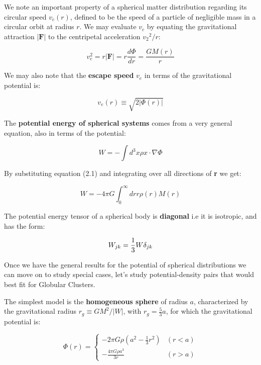 We note an important property of a spherical matter distribution regarding its circular speed $v_{c}(r)$, defined to be the speed of a particle of negligible mass in a circular orbit at radius $r$. We may evaluate $v_{c}$ by equating the gravitational attraction $|\textbf{F}|$  to the centripetal acceleration ${v_{2}}^{2}/r$:

\begin{equation}
v_{c}^{2}=r|\textbf{F}|=r\frac{d\Phi}{dr}=\frac{GM(r)}{r}
\end{equation}

We may also note that the \textbf{escape speed} $v_{e}$ in terms of the gravitational potential is:

\begin{equation}
v_{e}(r)\equiv\sqrt{2|\Phi(r)|}
\end{equation}

The \textbf{potential energy of spherical systems}  comes from a very general equation, also in terms of the potential:

\begin{equation}
W=-\int d^{3}x\rho x\cdot\nabla\Phi
\end{equation}

By substituting equation (2.1) and integrating over all directions of \textbf{r} we get:

\begin{equation}
W=-4\pi G\int_{0}^{\infty}drr\rho(r)M(r)
\end{equation}

The potential energy tensor of a spherical body is \textbf{diagonal} i.e it is isotropic, and has the form:

\begin{equation}
W_{jk}={{1}\over{3}}W\delta_{jk}
\end{equation}

Once we have the general results for the potential of spherical distributions we can move on to study special cases, let's study potential-density pairs that would best fit for Globular Clusters.

The simplest model is the \textbf{homogeneous sphere} of radius $a$, characterized by the gravitational radius $r_{g}\equiv GM^{2}/|W|$, with $r_{g}=\frac{5}{3}a$, for which the gravitational potential is:

\begin{equation}
\Phi(r) = \left\lbrace
\begin{array}{ll}
-2\pi G\rho\left(a^{2}-\frac{1}{3}r^{2}\right) & (r<a)\\
-\frac{4\pi G\rho a^{3}}{3r} & (r>a)
\end{array}
\right.
\end{equation} 

